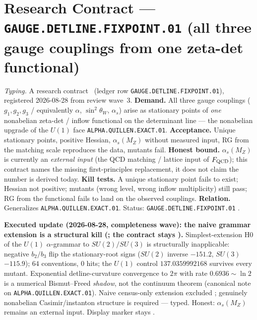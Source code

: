 \section*{Research Contract --- \texttt{GAUGE.DETLINE.FIXPOINT.01} (all three gauge couplings from one zeta-det functional)}
\noindent\emph{Typing.} A research contract \mO\ (ledger row \texttt{GAUGE.DETLINE.FIXPOINT.01}),
registered 2026-08-28 from review wave~3.  \textbf{Demand.}  All three gauge
couplings ($g_1,g_2,g_3$ / equivalently $\alpha$, $\sin^2\theta_W$, $\alpha_s$) arise as
stationary points of \emph{one} nonabelian zeta-det / inflow functional on the determinant line ---
the nonabelian upgrade of the $U(1)$ face \texttt{ALPHA.QUILLEN.EXACT.01}.  \textbf{Acceptance.}
Unique stationary points, positive Hessian, $\alpha_s(M_Z)$ without measured input, RG from the
matching scale reproduces the data, mutants fail.  \textbf{Honest bound.}  $\alpha_s(M_Z)$ is
currently an \emph{external input} (the QCD matching / lattice input of $F_{\rm QCD}$); this
contract names the missing first-principles replacement, it does not claim the number is derived
today.  \textbf{Kill tests.}  A unique stationary point fails to exist; Hessian not positive;
mutants (wrong level, wrong inflow multiplicity) still pass; RG from the functional fails to land
on the observed couplings.  \textbf{Relation.}  Generalizes \texttt{ALPHA.QUILLEN.EXACT.01}.
Status: \texttt{GAUGE.DETLINE.FIXPOINT.01} \mO.

\par\smallskip\noindent\textbf{Executed update (2026-08-28, completeness wave): the naive grammar
extension is a structural kill
(; the contract stays \mO).}
Simplest-extension H0 of the $U(1)$ $\alpha$-grammar to $SU(2)/SU(3)$ is structurally inapplicable:
negative $b_2/b_3$ flip the stationary-root signs ($SU(2)$ inverse $-151.2$, $SU(3)$ $-115.9$);
$64$ conventions, $0$ hits; the $U(1)$ control $137.0359992168$ survives every mutant.
Exponential detline-curvature convergence to $2\pi$ with rate $0.6936\sim\ln 2$ is a numerical
Bismut--Freed \emph{shadow}, not the continuum theorem (canonical note on
\texttt{ALPHA.QUILLEN.EXACT.01}).  Naive census-only extension excluded \mE; genuinely nonabelian
Casimir/instanton structure is required --- typed.  Honest: $\alpha_s(M_Z)$ remains an external
input.  Display marker stays \mO.

